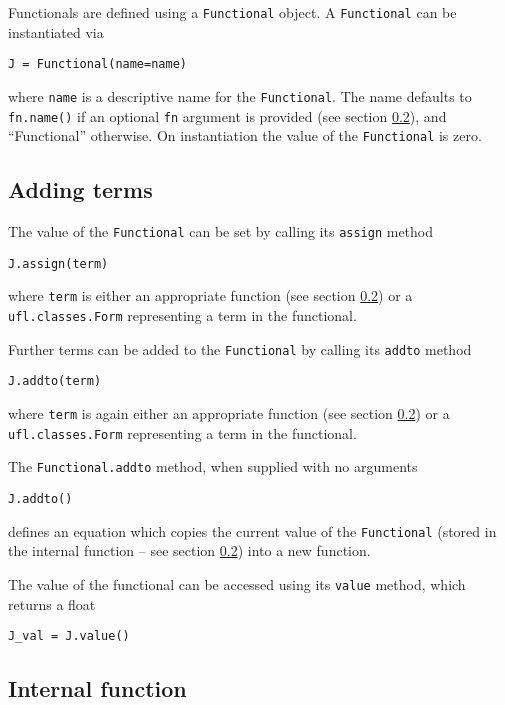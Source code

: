 \documentclass[11pt]{article}
\begin{document}
Functionals are defined using a \texttt{Functional} object. A
\texttt{Functional} can be instantiated via
\begin{lstlisting}
J = Functional(name=name)
\end{lstlisting}
where \texttt{name} is a descriptive name for the \texttt{Functional}. The name
defaults to \texttt{fn.name()} if an optional \texttt{fn} argument is provided
(see section \ref{sect:Functional_internals}), and ``Functional'' otherwise. On
instantiation the value of the \texttt{Functional} is zero.

\subsection{Adding terms}

The value of the \texttt{Functional} can be set by calling its \texttt{assign}
method
\begin{lstlisting}
J.assign(term)
\end{lstlisting}
where \texttt{term} is either an appropriate function (see section
\ref{sect:Functional_internals}) or a \texttt{ufl.classes.Form} representing a
term in the functional.

Further terms can be added to the \texttt{Functional} by calling its
\texttt{addto} method
\begin{lstlisting}
J.addto(term)
\end{lstlisting}
where \texttt{term} is again either an appropriate function (see section
\ref{sect:Functional_internals}) or a \texttt{ufl.classes.Form} representing a
term in the functional.

The \texttt{Functional.addto} method, when supplied with no arguments
\begin{lstlisting}
J.addto()
\end{lstlisting}
defines an equation which copies the current value of the \texttt{Functional}
(stored in the internal function -- see section
\ref{sect:Functional_internals}) into a new function.

The value of the functional can be accessed using its \texttt{value} method,
which returns a float
\begin{lstlisting}
J_val = J.value()
\end{lstlisting}

\subsection{Internal function}\label{sect:Functional_internals}
\end{document}
